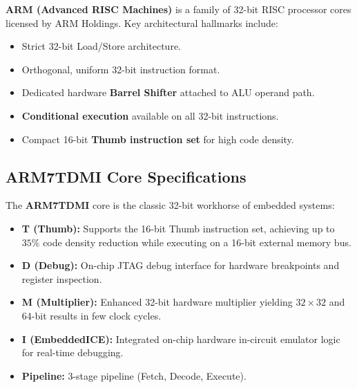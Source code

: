 \documentclass[12pt,a4paper]{article}
\begin{document}
\begin{tcolorbox}[defbox, title={ARM Architecture Overview}]
\textbf{ARM (Advanced RISC Machines)} is a family of 32-bit RISC processor cores licensed by ARM Holdings. Key architectural hallmarks include:
\begin{itemize}[leftmargin=*]
  \item Strict 32-bit Load/Store architecture.
  \item Orthogonal, uniform 32-bit instruction format.
  \item Dedicated hardware \textbf{Barrel Shifter} attached to ALU operand path.
  \item \textbf{Conditional execution} available on all 32-bit instructions.
  \item Compact 16-bit \textbf{Thumb instruction set} for high code density.
\end{itemize}
\end{tcolorbox}

\subsection{ARM7TDMI Core Specifications}
The \textbf{ARM7TDMI} core is the classic 32-bit workhorse of embedded systems:
\begin{itemize}[leftmargin=*]
  \item \textbf{T (Thumb):} Supports the 16-bit Thumb instruction set, achieving up to $35\%$ code density reduction while executing on a 16-bit external memory bus.
  \item \textbf{D (Debug):} On-chip JTAG debug interface for hardware breakpoints and register inspection.
  \item \textbf{M (Multiplier):} Enhanced 32-bit hardware multiplier yielding $32 \times 32$ and $64$-bit results in few clock cycles.
  \item \textbf{I (EmbeddedICE):} Integrated on-chip hardware in-circuit emulator logic for real-time debugging.
  \item \textbf{Pipeline:} 3-stage pipeline (Fetch, Decode, Execute).
\end{itemize}
\end{document}
